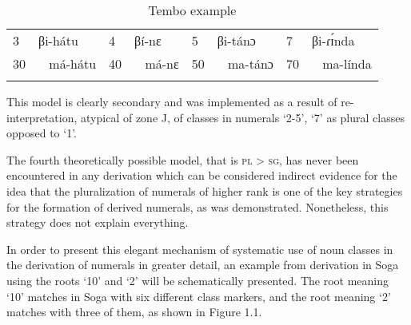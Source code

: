 \begin{table}
\caption{\label{tab:1:24} Tembo example}

\begin{tabularx}{\textwidth}{lX lX lX lX}
\lsptoprule

3 &  βi-h{\'{a}}tu & 4 &  β{\'{i}}-nɛ & 5 &  βi-t{\'{a}}nɔ & 7 &  βi-ɾ{\'{ɪ}}nda\\
30 & ~ m{\'{a}}-h{\'{a}}tu & 40 & ~ m{\'{a}}-nɛ & 50 & ~ ma-t{\'{a}}nɔ & 70 & ~ ma-l{\'{i}}nda\\
\lspbottomrule
\end{tabularx}
\end{table}


This model is clearly secondary and was implemented as a result of re-interpretation, atypical of zone J, of classes in numerals ‘2-5’, ‘7’ as plural classes opposed to ‘1’. 

The fourth theoretically possible model, that is \textsc{pl} > \textsc{sg}, has never been encountered in any derivation which can be considered indirect evidence for the idea that the pluralization of numerals of higher rank is one of the key strategies for the formation of derived numerals, as was demonstrated. Nonetheless, this strategy does not explain everything. 

In order to present this elegant mechanism of systematic use of noun classes in the derivation of numerals in greater detail, an example from derivation in Soga using the roots `10' and `2' will be schematically presented. The root meaning `10' matches in Soga with six different class markers, and the root meaning ‘2’ matches with three of them, as shown in Figure 1.1. 
 








